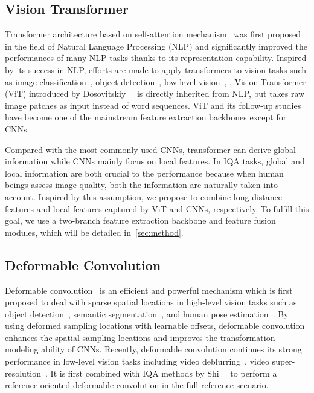 \documentclass[10pt,twocolumn,letterpaper]{article}
\begin{document}
\subsection{Vision Transformer}
Transformer architecture based on self-attention mechanism~\cite{vaswani2017attention} was first proposed in the field of Natural Language Processing (NLP) and significantly improved the performances of many NLP tasks thanks to its representation capability. Inspired by its success in NLP, efforts are made to apply transformers to vision tasks such as image classification~\cite{dosovitskiy2020image}, object detection~\cite{carion2020end, zhu2020deformable}, low-level vision~\cite{yang2020learning}, \etc. Vision Transformer (ViT) introduced by Dosovitskiy~\etal~\cite{dosovitskiy2020image} is directly inherited from NLP, but takes raw image patches as input instead of word sequences. ViT and its follow-up studies have become one of the mainstream feature extraction backbones except for CNNs.

Compared with the most commonly used CNNs, transformer can derive global information while CNNs mainly focus on local features. In IQA tasks, global and local information are both crucial to the performance because when human beings assess image quality, both the information are naturally taken into account. Inspired by this assumption, we propose to combine long-distance features and local features captured by ViT and CNNs, respectively. To fulfill this goal, we use a two-branch feature extraction backbone and feature fusion modules, which will be detailed in~\cref{sec:method}. 


\subsection{Deformable Convolution}
Deformable convolution~\cite{dai2017deformable} is an efficient and powerful mechanism which is first proposed to deal with sparse spatial locations in high-level vision tasks such as object detection~\cite{dai2017deformable,bertasius2018object, zhu2019deformable }, semantic segmentation~\cite{zhu2019deformable}, and human pose estimation~\cite{sun2018integral}. By using deformed sampling locations with learnable offsets, deformable convolution enhances the spatial sampling locations and improves the transformation modeling ability of CNNs. Recently, deformable convolution continues its strong performance in low-level vision tasks including video deblurring~\cite{wang2019edvr}, video super-resolution~\cite{chan2021understanding}. It is first combined with IQA methods by Shi~\etal~\cite{shi2021region} to perform a reference-oriented deformable convolution in the full-reference scenario.
\end{document}
